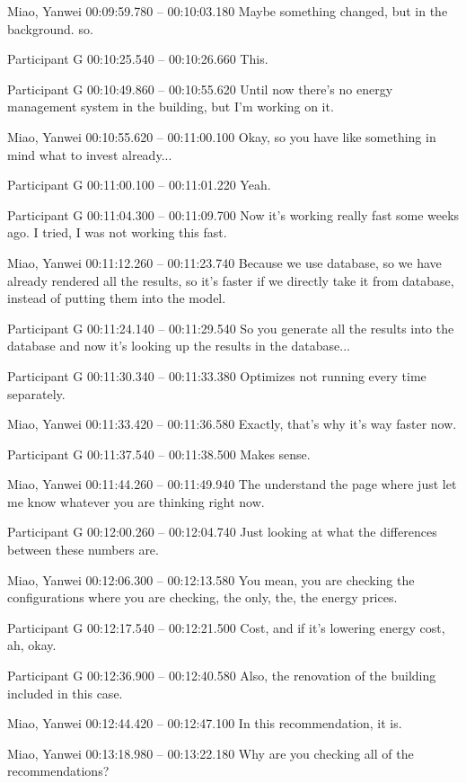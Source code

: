 {Miao, Yanwei 00:09:59.780 -- 00:10:03.180
Maybe something changed, but in the background. so.

Participant G 00:10:25.540 -- 00:10:26.660
This.

Participant G 00:10:49.860 -- 00:10:55.620
Until now there's no energy management system in the building, but I'm working on it.

Miao, Yanwei 00:10:55.620 -- 00:11:00.100
Okay, so you have like something in mind what to invest already...

Participant G 00:11:00.100 -- 00:11:01.220
Yeah.

Participant G 00:11:04.300 -- 00:11:09.700
Now it's working really fast some weeks ago. I tried, I was not working this fast.

Miao, Yanwei 00:11:12.260 -- 00:11:23.740
Because we use database, so we have already rendered all the results, so it's faster if we directly take it from database, instead of putting them into the model.

Participant G 00:11:24.140 -- 00:11:29.540
So you generate all the results into the database and now it's looking up the results in the database...

Participant G 00:11:30.340 -- 00:11:33.380
Optimizes not running every time separately.

Miao, Yanwei 00:11:33.420 -- 00:11:36.580
Exactly, that's why it's way faster now.

Participant G 00:11:37.540 -- 00:11:38.500
Makes sense.

Miao, Yanwei 00:11:44.260 -- 00:11:49.940
The understand the page where just let me know whatever you are thinking right now.

Participant G 00:12:00.260 -- 00:12:04.740
Just looking at what the differences between these numbers are.

Miao, Yanwei 00:12:06.300 -- 00:12:13.580
You mean, you are checking the configurations where you are checking, the only, the, the energy prices.

Participant G 00:12:17.540 -- 00:12:21.500
Cost, and if it's lowering energy cost, ah, okay.

Participant G 00:12:36.900 -- 00:12:40.580
Also, the renovation of the building included in this case.

Miao, Yanwei 00:12:44.420 -- 00:12:47.100
In this recommendation, it is.

Miao, Yanwei 00:13:18.980 -- 00:13:22.180
Why are you checking all of the recommendations?

}
